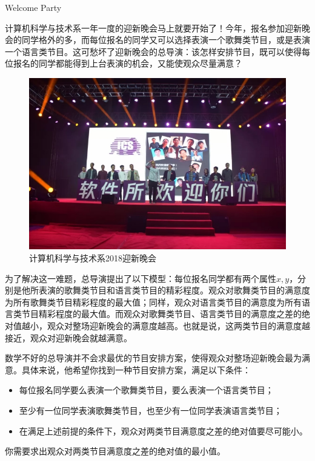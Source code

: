 \begin{Problem}{Welcome Party}{}

计算机科学与技术系一年一度的迎新晚会马上就要开始了！今年，报名参加迎新晚会的同学格外的多，而每位报名的同学又可以选择表演一个歌舞类节目，或是表演一个语言类节目。这可愁坏了迎新晚会的总导演：该怎样安排节目，既可以使得每位报名的同学都能得到上台表演的机会，又能使观众尽量满意？

\begin{figure}[h]
\center
\includegraphics[width=12cm]{src/party/party.jpg}
\caption{计算机科学与技术系2018迎新晚会}
\end{figure}

为了解决这一难题，总导演提出了以下模型：每位报名同学都有两个属性$x, y$，分别是他所表演的歌舞类节目和语言类节目的精彩程度。观众对歌舞类节目的满意度为所有歌舞类节目精彩程度的最大值；同样，观众对语言类节目的满意度为所有语言类节目精彩程度的最大值。而观众对歌舞类节目、语言类节目的满意度之差的绝对值越小，观众对整场迎新晚会的满意度越高。也就是说，这两类节目的满意度越接近，观众对迎新晚会就越满意。

数学不好的总导演并不会求最优的节目安排方案，使得观众对整场迎新晚会最为满意。具体来说，他希望你找到一种节目安排方案，满足以下条件：

\begin{itemize}
\item 每位报名同学要么表演一个歌舞类节目，要么表演一个语言类节目；
\item 至少有一位同学表演歌舞类节目，也至少有一位同学表演语言类节目；
\item 在满足上述前提的条件下，观众对两类节目满意度之差的绝对值要尽可能小。
\end{itemize}

你需要求出观众对两类节目满意度之差的绝对值的最小值。


\end{Problem}
